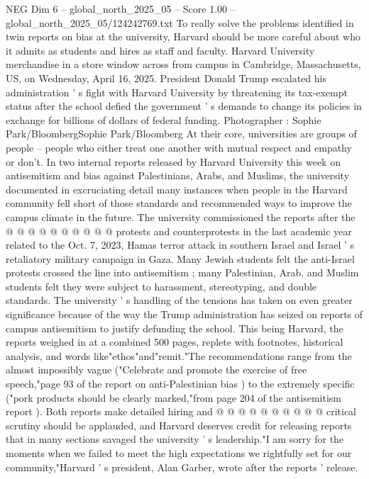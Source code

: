 \begin{textsample}{NEG Dim 6 – global\_north\_2025\_05 – Score 1.00 – global\_north\_2025\_05/124242769.txt}  \label{ex:f6_neg_378}
To really solve the problems identified in twin reports on bias at the university, Harvard should be more careful about who it admits as students and hires as staff and faculty.
Harvard University merchandise in a store window across from campus in Cambridge, Massachusetts, US, on Wednesday, April 16, 2025.
President Donald Trump escalated his administration ' s fight with Harvard University by threatening its tax-exempt status after the school defied the government ' s demands to change its policies in exchange for billions of dollars of federal funding.
Photographer : Sophie Park/BloombergSophie Park/Bloomberg At their core, universities are groups of people -- people who either treat one another with mutual respect and empathy or don't.
In two internal reports released by Harvard University this week on antisemitism and bias against Palestinians, Arabs, and Muslims, the university documented in excruciating detail many instances when people in the Harvard community fell short of those standards and recommended ways to improve the campus climate in the future.
The university commissioned the reports after the @ @ @ @ @ @ @ @ @ @ protests and counterprotests in the last academic year related to the Oct. 7, 2023, Hamas terror attack in southern Israel and Israel ' s retaliatory military campaign in Gaza.
Many Jewish students felt the anti-Israel protests crossed the line into antisemitism ; many Palestinian, Arab, and Muslim students felt they were subject to harassment, stereotyping, and double standards.
The university ' s handling of the tensions has taken on even greater significance because of the way the Trump administration has seized on reports of campus antisemitism to justify defunding the school.
This being Harvard, the reports weighed in at a combined 500 pages, replete with footnotes, historical analysis, and words like"ethos"and"remit."The recommendations range from the almost impossibly vague ("Celebrate and promote the exercise of free speech,"page 93 of the report on anti-Palestinian bias ) to the extremely specific ("pork products should be clearly marked,"from page 204 of the antisemitism report ).
Both reports make detailed hiring and @ @ @ @ @ @ @ @ @ @ critical scrutiny should be applauded, and Harvard deserves credit for releasing reports that in many sections savaged the university ' s leadership."I am sorry for the moments when we failed to meet the high expectations we rightfully set for our community,"Harvard ' s president, Alan Garber, wrote after the reports ' release.

\end{textsample}
